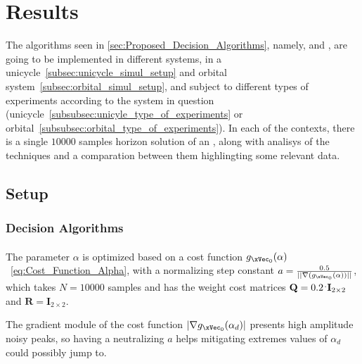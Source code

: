
%


\chapter{Results}
\label{cha:results}

The algorithms seen in \ref{sec:Proposed_Decision_Algorithms}, namely, \label{subsec:decision_algorithms}  and ,  are going to be implemented in different systems, in a unicycle~\ref{subsec:unicycle_simul_setup} and orbital system~\ref{subsec:orbital_simul_setup}, and subject to different types of experiments according to the system in question (unicycle~\ref{subsubsec:unicyle_type_of_experiments} or orbital~\ref{subsubsec:orbital_type_of_experiments}). In each of the contexts, there is a single \(10000\) samples horizon solution of an , along with analisys of the techniques and a comparation between them highlingting some relevant data.

\section{Setup}
\label{sec:setup}

\subsection{Decision Algorithms}
\label{subsec:decision_algorithms}

\subsubsection{}
\label{subsubsec:A-JO_parameters}

The parameter \(\alpha\) is optimized based on a cost function \(g_{\xVec_0}(\alpha)\)~\ref{eq:Cost_Function_Alpha}, with a normalizing step constant \(a = \frac{0.5}{||\nabla(g_{\xVec_0}(\alpha))||}\), which takes \(N=10000\) samples and has the weight cost matrices \(\mathbf{Q} = 0.2\hspace{0.1em}^.\mathbf{I}_{2\times 2} \) and \(\mathbf{R} = \mathbf{I}_{2\times 2} \).\par  
The gradient module of the cost function \(|\nabla g_{\xVec_0}(\alpha_d)|\) presents high amplitude noisy peaks, so having a neutralizing \(a\) helps mitigating extremes values of \(\alpha_d\) could possibly jump to.\\

